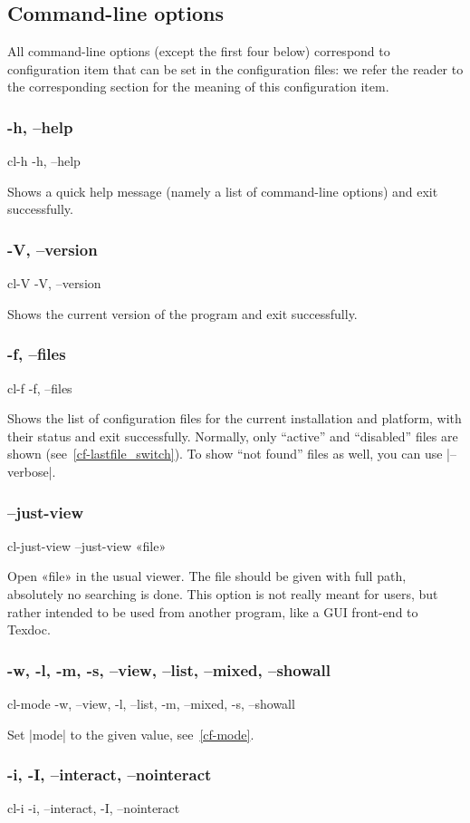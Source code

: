 \documentclass[a4paper,oneside]{scrartcl}
\newif\ifframed
\newenvironment{cmdsubsub}[2]
  {\framedfalse \commandes\subsubsection{#1}{#2}}
  {\endcommandes}
\begin{document}
\subsection{Command-line options}\label{ss-cl}

All command-line options (except the first four below) correspond to
configuration item that can be set in the configuration files: we refer
the reader to the corresponding section for the meaning of this configuration
item.

\begin{cmdsubsub}{-h, --help}{cl-h}
  -h, --help
\end{cmdsubsub}

Shows a quick help message (namely a list of command-line options) and exit
successfully.

\begin{cmdsubsub}{-V, --version}{cl-V}
  -V, --version
\end{cmdsubsub}

Shows the current version of the program and exit successfully.

\begin{cmdsubsub}{-f, --files}{cl-f}
  -f, --files
\end{cmdsubsub}

Shows the list of configuration files for the current installation and
platform, with their status and exit successfully. Normally, only ``active''
and ``disabled'' files are shown (see~\ref{cf-lastfile_switch}). To show ``not
found'' files as well, you can use |--verbose|.

\begin{cmdsubsub}{--just-view}{cl-just-view}
  --just-view «file»
\end{cmdsubsub}

Open «file» in the usual viewer. The file should be given with full path,
absolutely no searching is done. This option is not really meant for users,
but rather intended to be used from another program, like a GUI front-end to
Texdoc.

\begin{cmdsubsub}{-w, -l, -m, -s, --view, --list, --mixed, --showall}{cl-mode}
  -w, --view, -l, --list, -m, --mixed, -s, --showall
\end{cmdsubsub}

Set |mode| to the given value, see~\ref{cf-mode}.

\begin{cmdsubsub}{-i, -I, --interact, --nointeract}{cl-i}
  -i, --interact, -I, --nointeract
\end{cmdsubsub}
\end{document}
